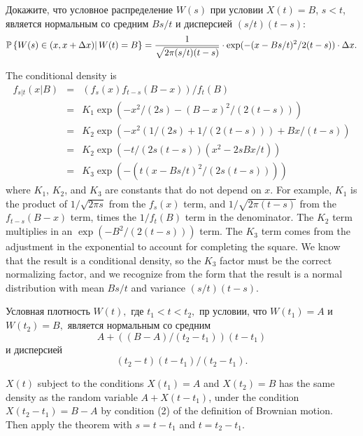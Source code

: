 \begin{problem}
  Докажите, что условное распределение $W(s)$ при условии $X(t)=B$,
  $s < t $, является нормальным со средним $B s/t$ и дисперсией $(s/t)(t-s)$:
  $$
    \mathbb{P}\left\{ W(s) \in (x,x+\Delta x) |\, W(t) = B\right\} =
    \frac{1}{\sqrt{2\pi (s/t)(t-s)}}\cdot \exp(-(x-Bs/t)^2/2(t-s)) \cdot\Delta x.
  $$


\begin{sol}

The conditional density is
\begin{eqnarray*}
  f_{s|t}(x|B) &=& ( f_s(x) f_{t-s}(B-x) )/ f_t(B) \\
  &=& K_1 \exp( -x^2/(2s) - (B-x)^2/( 2(t-s) ) ) \\
  &=& K_2 \exp(-x^2(1/(2 s)+ 1/(2 (t-s) )) + Bx/(t-s) ) \\
  &=& K_2 \exp( -t/( 2 s (t-s) ) ( x^2 - 2 s B x/t) ) \\
  &=& K_3 \exp( - (t (x - B s/t)^2/ (2 s (t-s)) ) )
\end{eqnarray*}
where $ K_1 $, $ K_2 $, and $ K_3 $ are constants that do not depend on $
x $.  For example, $ K_1 $ is the product of $ 1/\sqrt{2 \pi s} $ from
the $ f_s(x) $ term, and $ 1/\sqrt{2 \pi (t-s)} $ from the $ f_{t-s}(B-x)
$ term, times the $ 1/f_t(B) $ term in the denominator.  The $ K_2 $
term multiplies in an $ \exp(-B^2/(2 (t-s))) $ term.  The $ K_3 $ term
comes from the adjustment in the exponential to account for completing
the square.  We know that the result is a conditional density, so the $
K_3 $ factor must be the correct normalizing factor, and we recognize
from the form that the result is a normal distribution with mean $ B s/t
$ and variance $ (s/t) (t-s) $.
\end{sol}
\end{problem}

\begin{problem}
 Условная плотность $W(t),$ где $t_1 < t < t_2,$ пр условии, что
  $W(t_1)=A$ и $W(t_2) = B,$ является нормальным со средним
  $$
    A + ( (B-A)/(t_2-t_1) ) (t-t_1)
  $$
  \ni и дисперсией
  $$
    (t_2-t)(t-t_1)/(t_2-t_1).
  $$


\begin{sol}
$ X(t) $ subject to the conditions $ X(t_1) = A $ and $ X(t_2)
= B $ has the same density as the random variable $ A + X(t-t_1) $,
under the condition $ X(t_2 - t_1) = B - A $ by condition (2) of the
definition of Brownian motion.  Then apply the theorem with $ s = t-t_1 $
and $ t = t_2 - t_1 $.
\end{sol}
\end{problem}

